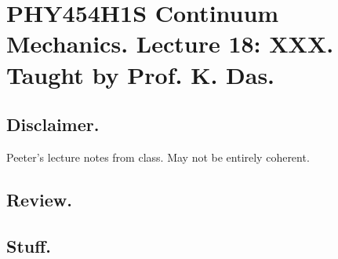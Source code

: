 
%

\chapter{PHY454H1S Continuum Mechanics.  Lecture 18: XXX.  Taught by Prof. K. Das.}
\label{chap:continuumL18}
{}
\date{Mar 21, 2012}

\beginArtWithToc

\section{Disclaimer.}

Peeter's lecture notes from class.  May not be entirely coherent.

\section{Review.}

\section{Stuff.}


\EndArticle
